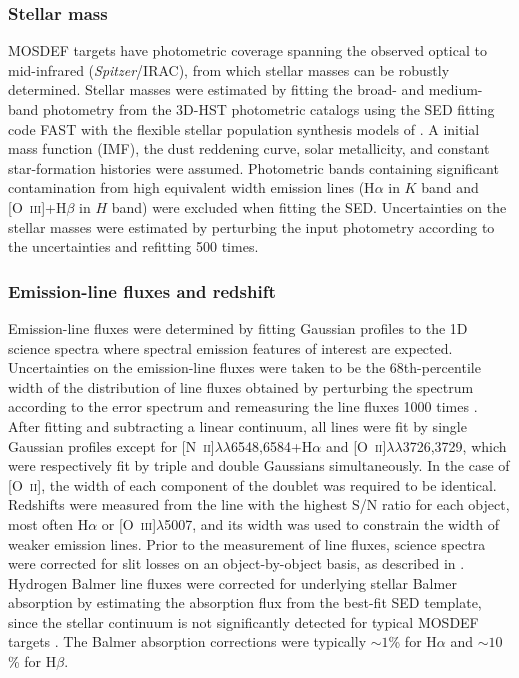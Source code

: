 \documentclass[iop,twocolappendix]{emulateapj}
\newcommand{\ii}{~\textsc{ii}}
\newcommand{\iii}{~\textsc{iii}}
\begin{document}
\subsubsection{Stellar mass}

MOSDEF targets have photometric coverage spanning the observed optical to mid-infrared
 (\textit{Spitzer}/IRAC), from which stellar masses can be robustly determined.
  Stellar masses were estimated by fitting the broad- and medium-band photometry from the 3D-HST
 photometric catalogs \citep{ske14,mom16} using the SED
 fitting code FAST \citep{kri09} with the flexible stellar population synthesis models of \citet{con09}.
  A \citet{cha03} initial mass function (IMF), the \citet{cal00} dust reddening curve, solar metallicity, and
 constant star-formation histories were assumed.
  Photometric bands containing significant contamination from high equivalent width
 emission lines (H$\alpha$ in $K$ band and [O\iii]+H$\beta$ in $H$ band) were excluded when fitting the
 SED.
  Uncertainties on the stellar masses were estimated by perturbing the input photometry
 according to the uncertainties and refitting 500 times.

\subsubsection{Emission-line fluxes and redshift}

Emission-line fluxes were determined by fitting Gaussian profiles to the 1D science spectra
 where spectral emission features of interest are expected.  Uncertainties on the emission-line
 fluxes were taken to be the 68th-percentile width of the distribution of line fluxes obtained
 by perturbing the spectrum according to the error spectrum and remeasuring the line fluxes 1000
 times \citep{red15}.  After fitting and subtracting a linear continuum,
 all lines were fit by single Gaussian profiles except for
 [N\ii]$\lambda\lambda$6548,6584+H$\alpha$ and [O\ii]$\lambda\lambda$3726,3729, which were respectively fit by
 triple and double Gaussians simultaneously.  In the case of [O\ii], the width of each component
 of the doublet was required to be identical.  Redshifts were measured from the line with the
 highest S/N ratio for each object, most often H$\alpha$ or [O\iii]$\lambda$5007, and its width
 was used to constrain the width of weaker emission lines.
  Prior to the measurement of line fluxes,
 science spectra were corrected for slit losses on an object-by-object basis, as described in \citet{kri15}.
  Hydrogen Balmer line fluxes were corrected for underlying stellar Balmer absorption by estimating
 the absorption flux from the best-fit SED template, since the stellar continuum is not
 significantly detected for typical MOSDEF targets \citep{red15}.  The Balmer absorption
 corrections were typically $\sim1$\% for H$\alpha$ and $\sim10$\% for H$\beta$.
\end{document}
